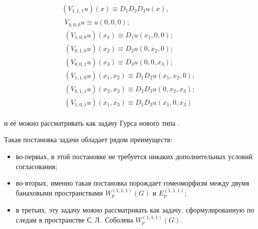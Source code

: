 \begin{gather}

\label{mam:5}

( V_{1, 1, 1} u) (x) \equiv D_1  D_2  D_3  u(x),

\\

\label{mam:6}

\begin{array}{l}

V_{0, 0, 0} u\equiv u( 0, 0, 0) ; \\

\left( V_{1, 0, 0} u\right) \left( x_1  \right) \equiv D_1  u\left( x_1 , 0, 0\right) ; \\

\left( V_{0, 1, 0} u\right) \left( x_2  \right) \equiv D_2  u\left( 0, x_2 , 0\right) ; \\

\left( V_{0, 0, 1} u\right) \left( x_3  \right) \equiv D_3  u\left(0, 0, x_3  \right) ; \\

\left( V_{1,1,0} u\right) \left( x_1  ,x_2  \right) \equiv D_1  D_2 

u\left( x_1 , x_2 , 0\right) ; \\

\left( V_{0, 1, 1} u\right) \left( x_2  ,x_3  \right) \equiv D_2  D_3 

u\left( 0, x_2  , x_3  \right) ; \\

\left( V_{1, 0, 1} u\right) \left( x_1  ,x_3  \right) \equiv D_1  D_3 

u\left( x_1 , 0, x_3  \right) 

\end{array}

\end{gather}

и её можно рассматривать как задачу Гурса нового типа \cite[с. 17]{mam:bib:19}. 

Такая  постановка задачи обладает рядом преимуществ:

\begin{itemize}

\item во-первых, в этой постановке не требуется никаких дополнительных условий согласования;

\item во-вторых, именно такая постановка порождает гомеоморфизм  между двумя банаховыми пространствами $W_{p} ^{(1, 1, 1) } \left( G\right)$  и  $E_{p} ^{\left( 1,1,1\right) }$;

\item в третьих, эту задачу можно рассматривать как задачу, сформулированную по следам в пространстве С.\,Л.~Соболева  $W_{p} ^{(1, 1, 1) } \left( G\right)$.

\end{itemize}



